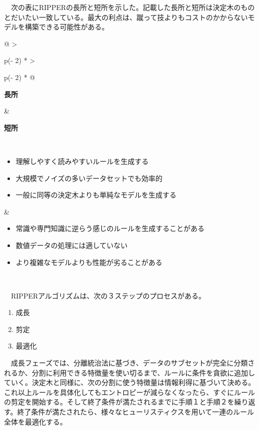 \documentclass[
]{article}
\providecommand{\tightlist}{%
  \setlength{\itemsep}{0pt}\setlength{\parskip}{0pt}}
\begin{document}
　次の表にRIPPERの長所と短所を示した。記載した長所と短所は決定木のものとだいたい一致している。最大の利点は、蹴って技よりもコストのかからないモデルを構築できる可能性がある。

\begin{longtable}[]{@{}
  >{\raggedright\arraybackslash}p{(\columnwidth - 2\tabcolsep) * }
  >{\raggedright\arraybackslash}p{(\columnwidth - 2\tabcolsep) * }@{}}
\toprule\noalign{}
\begin{minipage}[b]{\linewidth}\raggedright
\textbf{長所}
\end{minipage} & \begin{minipage}[b]{\linewidth}\raggedright
\textbf{短所}
\end{minipage} \\
\midrule\noalign{}
\endhead
\bottomrule\noalign{}
\endlastfoot
\begin{minipage}[t]{\linewidth}\raggedright
\begin{itemize}
\tightlist
\item
  理解しやすく読みやすいルールを生成する
\item
  大規模でノイズの多いデータセットでも効率的
\item
  一般に同等の決定木よりも単純なモデルを生成する
\end{itemize}
\end{minipage} & \begin{minipage}[t]{\linewidth}\raggedright
\begin{itemize}
\tightlist
\item
  常識や専門知識に逆らう感じのルールを生成することがある
\item
  数値データの処理には適していない
\item
  より複雑なモデルよりも性能が劣ることがある
\end{itemize}
\end{minipage} \\
\end{longtable}

　RIPPERアルゴリズムは、次の３ステップのプロセスがある。

\begin{enumerate}
\def\labelenumi{\arabic{enumi}.}
\tightlist
\item
  成長
\item
  剪定
\item
  最適化
\end{enumerate}

　成長フェーズでは、分離統治法に基づき、データのサブセットが完全に分類されるか、分割に利用できる特徴量を使い切るまで、ルールに条件を貪欲に追加していく。決定木と同様に、次の分割に使う特徴量は情報利得に基づいて決める。これ以上ルールを具体化してもエントロピーが減らなくなったら、すぐにルールの剪定を開始する。そして終了条件が満たされるまでに手順１と手順２を繰り返す。終了条件が満たされたら、様々なヒューリスティクスを用いて一連のルール全体を最適化する。
\end{document}
